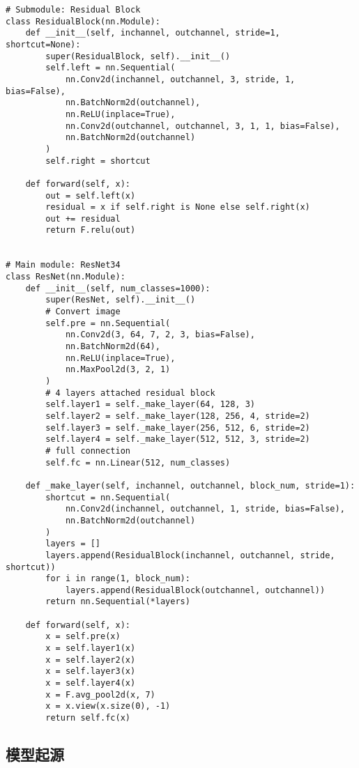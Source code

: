 \begin{lstlisting}
# Submodule: Residual Block
class ResidualBlock(nn.Module):
    def __init__(self, inchannel, outchannel, stride=1, shortcut=None):
        super(ResidualBlock, self).__init__()
        self.left = nn.Sequential(
            nn.Conv2d(inchannel, outchannel, 3, stride, 1, bias=False),
            nn.BatchNorm2d(outchannel),
            nn.ReLU(inplace=True),
            nn.Conv2d(outchannel, outchannel, 3, 1, 1, bias=False),
            nn.BatchNorm2d(outchannel)
        )
        self.right = shortcut

    def forward(self, x):
        out = self.left(x)
        residual = x if self.right is None else self.right(x)
        out += residual
        return F.relu(out)


# Main module: ResNet34
class ResNet(nn.Module):
    def __init__(self, num_classes=1000):
        super(ResNet, self).__init__()
        # Convert image
        self.pre = nn.Sequential(
            nn.Conv2d(3, 64, 7, 2, 3, bias=False),
            nn.BatchNorm2d(64),
            nn.ReLU(inplace=True),
            nn.MaxPool2d(3, 2, 1)
        )
        # 4 layers attached residual block
        self.layer1 = self._make_layer(64, 128, 3)
        self.layer2 = self._make_layer(128, 256, 4, stride=2)
        self.layer3 = self._make_layer(256, 512, 6, stride=2)
        self.layer4 = self._make_layer(512, 512, 3, stride=2)
        # full connection
        self.fc = nn.Linear(512, num_classes)

    def _make_layer(self, inchannel, outchannel, block_num, stride=1):
        shortcut = nn.Sequential(
            nn.Conv2d(inchannel, outchannel, 1, stride, bias=False),
            nn.BatchNorm2d(outchannel)
        )
        layers = []
        layers.append(ResidualBlock(inchannel, outchannel, stride, shortcut))
        for i in range(1, block_num):
            layers.append(ResidualBlock(outchannel, outchannel))
        return nn.Sequential(*layers)

    def forward(self, x):
        x = self.pre(x)
        x = self.layer1(x)
        x = self.layer2(x)
        x = self.layer3(x)
        x = self.layer4(x)
        x = F.avg_pool2d(x, 7)
        x = x.view(x.size(0), -1)
        return self.fc(x)
\end{lstlisting}

\subsection{模型起源}\label{ux6a21ux578bux8d77ux6e90}

